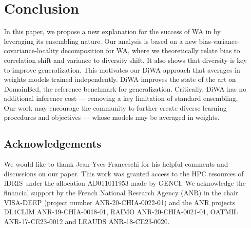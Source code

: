 \section{Conclusion}
In this paper, we propose a new explanation for the success of WA in \ood by leveraging its ensembling nature.
Our analysis is based on a new bias-variance-covariance-locality decomposition for WA, where we theoretically relate bias to correlation shift and variance to diversity shift. It also shows that diversity is key to improve generalization.
This motivates our DiWA approach that averages in weights models trained independently.
DiWA improves the state of the art on DomainBed, the reference benchmark for \ood generalization.
Critically, DiWA has no additional inference cost --- removing a key limitation of standard ensembling.
Our work may encourage the community to further create diverse learning procedures and objectives --- whose models may be averaged in weights.

\subsection*{Acknowledgements}
We would like to thank Jean-Yves Franceschi for his helpful comments and discussions on our paper.
This work was granted access to the HPC resources of IDRIS under the allocation AD011011953 made by GENCI. We acknowledge the financial support by the French National Research Agency (ANR) in the chair VISA-DEEP (project number ANR-20-CHIA-0022-01) and the ANR projects DL4CLIM ANR-19-CHIA-0018-01, RAIMO ANR-20-CHIA-0021-01, OATMIL ANR-17-CE23-0012 and LEAUDS ANR-18-CE23-0020.